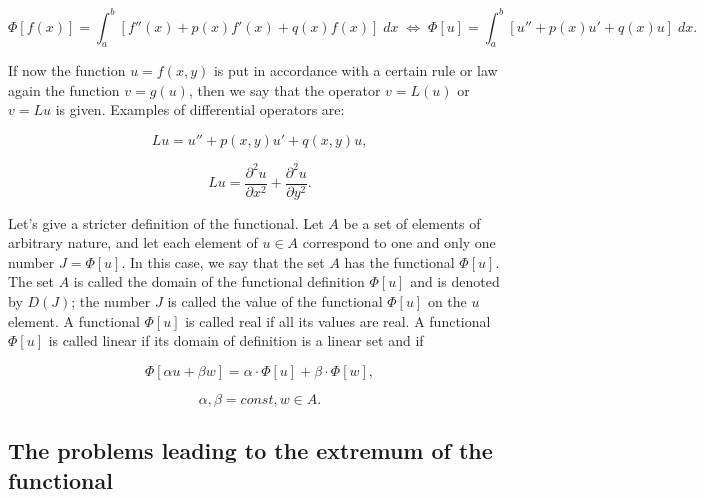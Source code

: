 \begin{displaymath}
	\Phi[f(x)] = \int_{a}^{b} [f''(x) + p(x)f'(x) + q(x)f(x)] \;  dx \; \Leftrightarrow \; \Phi[u] = \int_{a}^{b} [u'' + p(x)u' + q(x)u] \;  dx. 
\end{displaymath}

If now the function $u = f(x, y)$ is put in accordance with a certain rule or law again the function $v = g(u)$, then we say that the operator $v = L(u)$ or $v = Lu$ is given. Examples of differential operators are:

\begin{displaymath}
	Lu = u'' + p(x,y)u' + q(x,y)u,
\end{displaymath}

\begin{displaymath}
    Lu = \frac{\partial^2 u}{\partial x^2} + \frac{\partial^2 u}{\partial y^2}.
\end{displaymath}

Let's give a stricter definition of the functional. Let $A$ be a set of elements of arbitrary nature, and let each element of $u \in A$ correspond to one and only one number $J = \Phi[u]$. In this case, we say that the set $A$ has the functional $\Phi[u]$. The set $A$ is called the domain of the functional definition $\Phi[u]$ and is denoted by $D(J)$; the number $J$ is called the value of the functional $\Phi[u]$ on the $u$ element. A functional $\Phi[u]$ is called real if all its values are real. A functional $\Phi[u]$ is called linear if its domain of definition is a linear set and if

\begin{displaymath}
    \Phi[\alpha u + \beta w] = \alpha \cdot \Phi[u] + \beta \cdot \Phi[w],
\end{displaymath}

\begin{displaymath}
	\alpha, \beta = const, w \in A.
\end{displaymath}


\subsection{The problems leading to the extremum of the functional}



























